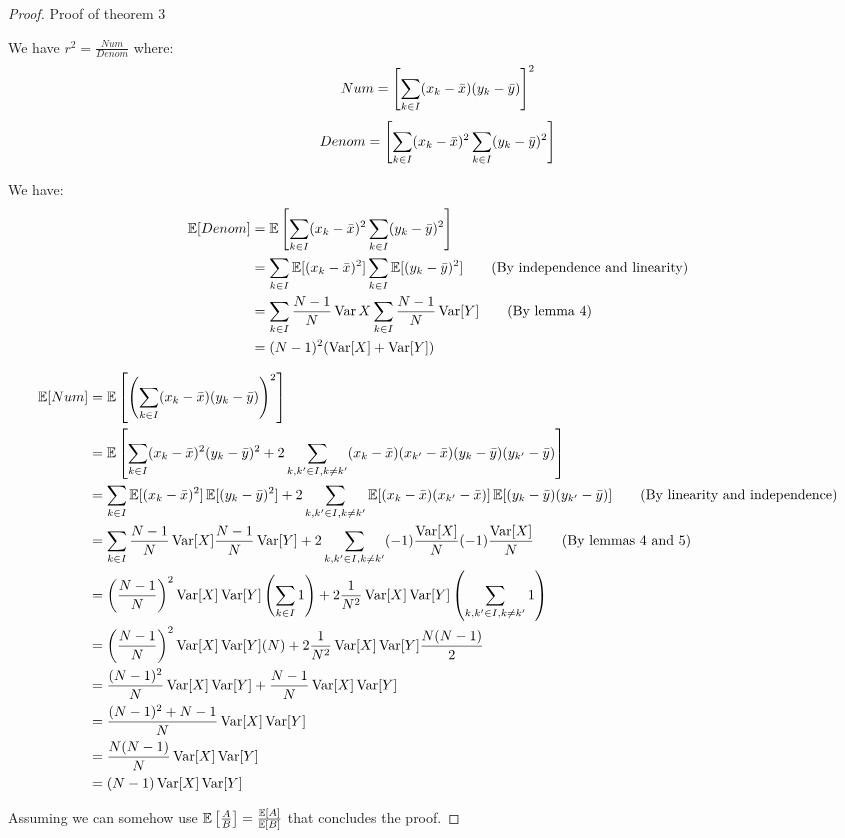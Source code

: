 \documentclass[11pt]{hw-template}
\begin{document}
  \newpage
  \begin{proof} Proof of theorem 3
    
    We have $r^2 = \frac{Num}{Denom}$ where:
    $$Num = \left[\sum_{k \in I} (x_k - \bar{x})(y_k - \bar{y})\right]^2$$
    $$Denom = \left[\sum_{k \in I} (x_k - \bar{x})^2\sum_{k \in I} (y_k - \bar{y})^2\right]$$
    
    
    We have:
    \begin{align*}
      \operatorname{\mathbb{E}}[Denom] 
      &= \operatorname{\mathbb{E}}\left[\sum_{k \in I} (x_k - \bar{x})^2\sum_{k \in I} (y_k - \bar{y})^2\right]\\
      &= \sum_{k \in I} \operatorname{\mathbb{E}}[(x_k - \bar{x})^2]\sum_{k \in I} \operatorname{\mathbb{E}}[(y_k - \bar{y})^2] \tag{By independence and linearity}\\
      &= \sum_{k \in I} \frac{N-1}{N}\operatorname{Var}{X}\sum_{k \in I} \frac{N-1}{N}\operatorname{Var}[Y] \tag{By lemma 4}\\
      &= (N-1)^2(\operatorname{Var}[X] + \operatorname{Var}[Y])
    \end{align*}
    
    \begin{align*}
      \operatorname{\mathbb{E}}[Num] 
      &= \operatorname{\mathbb{E}}\left[\left(\sum_{k \in I} (x_k - \bar{x})(y_k - \bar{y})\right)^2\right]\\
      &= \operatorname{\mathbb{E}}\left[\sum_{k \in I} (x_k - \bar{x})^2(y_k - \bar{y})^2 + 2 \sum_{k, k' \in I, k \neq k'} (x_k - \bar{x})(x_{k'} - \bar{x})(y_k - \bar{y})(y_{k'} - \bar{y})\right]\\
      &= \sum_{k \in I} \operatorname{\mathbb{E}}[(x_k - \bar{x})^2]\operatorname{\mathbb{E}}[(y_k - \bar{y})^2] + 2 \sum_{k, k' \in I, k \neq k'} \operatorname{\mathbb{E}}[(x_k - \bar{x})(x_{k'} - \bar{x})] \operatorname{\mathbb{E}}[(y_k - \bar{y})(y_{k'} - \bar{y})] \tag{By linearity and independence}\\
      &= \sum_{k \in I} \frac{N-1}{N}\operatorname{Var}[X]\frac{N-1}{N}\operatorname{Var}[Y] + 2 \sum_{k, k' \in I, k \neq k'} (-1)\frac{\operatorname{Var}[X]}{N} (-1)\frac{\operatorname{Var}[X]}{N} \tag{By lemmas 4 and 5}\\
      &= \left(\frac{N-1}{N}\right)^2\operatorname{Var}[X]\operatorname{Var}[Y] \left(\sum_{k \in I} 1\right) + 2 \frac{1}{N^2}\operatorname{Var}[X]\operatorname{Var}[Y] \left(\sum_{k, k' \in I, k \neq k'} 1\right)\\
      &= \left(\frac{N-1}{N}\right)^2\operatorname{Var}[X]\operatorname{Var}[Y] (N) + 2 \frac{1}{N^2}\operatorname{Var}[X]\operatorname{Var}[Y] \frac{N(N-1)}{2}\\
      &= \frac{(N-1)^2}{N}\operatorname{Var}[X]\operatorname{Var}[Y] + \frac{N-1}{N}\operatorname{Var}[X]\operatorname{Var}[Y]\\
      &= \frac{(N-1)^2 + N - 1}{N}\operatorname{Var}[X]\operatorname{Var}[Y] \\
      &= \frac{N(N-1)}{N}\operatorname{Var}[X]\operatorname{Var}[Y] \\
      &= (N-1)\operatorname{Var}[X]\operatorname{Var}[Y] \\
    \end{align*}
    
    Assuming we can somehow use $\operatorname{\mathbb{E}}\left[\frac{A}{B}\right] = \frac{\operatorname{\mathbb{E}}[A]}{\operatorname{\mathbb{E}}[B]}$ that concludes the proof.
  \end{proof}
  
\end{document}
